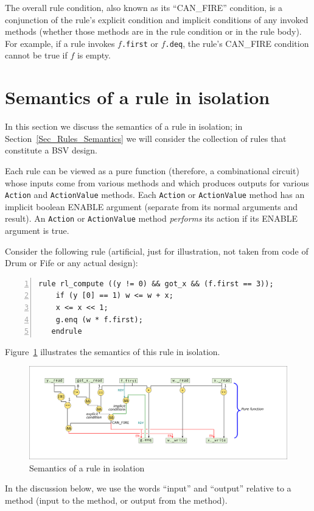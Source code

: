 The overall rule condition, also known as its ``CAN\_FIRE'' condition,
is a conjunction of the rule's explicit condition and implicit
conditions of any invoked methods (whether those methods are in the
rule condition or in the rule body).  For example, if a rule invokes
$f$\verb|.first| or $f$\verb|.deq|, the rule's CAN\_FIRE condition
cannot be true if $f$ is empty.


\section{Semantics of a rule in isolation}

\label{Sec_Single_Rule_Semantics}


In this section we discuss the semantics of a rule in isolation; in
Section~\ref{Sec_Rules_Semantics} we will consider the collection of
rules that constitute a BSV design.

Each rule can be viewed as a pure function (therefore, a combinational
circuit) whose inputs come from various methods and which produces
outputs for various \verb|Action| and \verb|ActionValue| methods.
Each \verb|Action| or \verb|ActionValue| method has an implicit
boolean ENABLE argument (separate from its normal arguments and
result).  An \verb|Action| or \verb|ActionValue| method
\emph{performs} its action if its ENABLE argument is true.

Consider the following rule (artificial, just for illustration, not
taken from code of Drum or Fife or any actual design):

{\small
\begin{Verbatim}[frame=single, numbers=left]
   rule rl_compute ((y != 0) && got_x && (f.first == 3));
    if (y [0] == 1) w <= w + x;
    x <= x << 1;
    g.enq (w * f.first);
   endrule
\end{Verbatim}
}

Figure~\ref{Fig_Rule_Actions_1} illustrates the semantics of this rule
in isolation.
\begin{figure}[htbp]
  \centerline{\includegraphics[width=6in,angle=0]{Figures/Fig_Rule_Actions_1}}
  \caption{\label{Fig_Rule_Actions_1} Semantics of a rule in isolation}
\end{figure}
In the discussion below, we use the words ``input'' and ``output''
relative to a method (input to the method, or output from the method).


